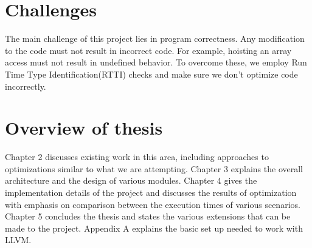 \section{Challenges}

The main challenge of this project lies in program correctness. Any modification to the code must not result in incorrect code. For example, hoisting an array access must not result in undefined behavior. To overcome these, we employ Run Time Type Identification(RTTI) checks and make sure we don't optimize code incorrectly.

\section{Overview of thesis}
Chapter 2 discusses existing work in this area, including approaches to optimizations similar to what we are attempting. Chapter 3 explains the overall architecture and the design of various modules. Chapter 4 gives the implementation details of the project and discusses the results of optimization with emphasis on comparison between the execution times of various scenarios. Chapter 5 concludes the thesis and states the various extensions that can be made to the project. Appendix A explains the basic set up needed to work with LLVM.